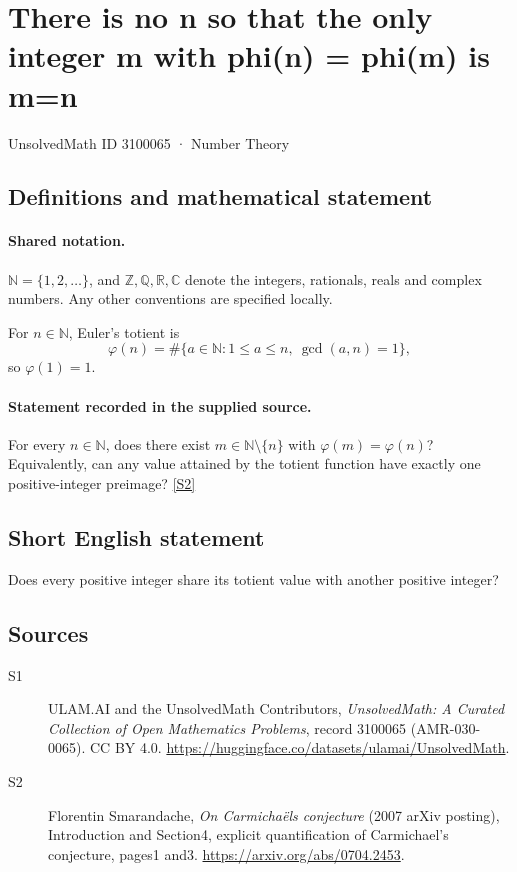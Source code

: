 \documentclass[11pt]{article}
\newcommand{\sref}[2]{\hyperlink{source:#1:#2}{[S#2]}}
\begin{document}
\setcounter{section}{3100064}
\section{There is no n so that the only integer m with phi(n) = phi(m) is m=n}\label{3100065}
{\small\sffamily UnsolvedMath ID 3100065 · Number Theory}
\subsection{Definitions and mathematical statement}

\paragraph{Shared notation.}$\mathbb N=\{1,2,\ldots\}$, and $\mathbb Z,\mathbb Q,\mathbb R,\mathbb C$ denote the integers, rationals, reals and complex numbers. Any other conventions are specified locally.


For $n\in\mathbb N$, Euler's totient is
\[\varphi(n)=\#\{a\in\mathbb N:1\le a\le n,\ \gcd(a,n)=1\},\]
so $\varphi(1)=1$.

\paragraph{Statement recorded in the supplied source.}
For every $n\in\mathbb N$, does there exist $m\in\mathbb N\setminus\{n\}$ with $\varphi(m)=\varphi(n)$? Equivalently, can any value attained by the totient function have exactly one positive-integer preimage? \sref{3100065}{2}

\subsection{Short English statement}
Does every positive integer share its totient value with another positive integer?
\subsection{Sources}
\begin{description}
\item[\hypertarget{source:3100065:1}{S1}] ULAM.AI and the UnsolvedMath Contributors, \emph{UnsolvedMath: A Curated Collection of Open Mathematics Problems}, record 3100065 (AMR-030-0065). CC BY 4.0. \url{https://huggingface.co/datasets/ulamai/UnsolvedMath}.
\item[\hypertarget{source:3100065:2}{S2}] Florentin Smarandache, \emph{On Carmichaël\textquotesingle s conjecture} (2007 arXiv posting), Introduction and Section4, explicit quantification of Carmichael’s conjecture, pages1 and3. \url{https://arxiv.org/abs/0704.2453}.
\end{description}
\label{end:3100065}
\end{document}
